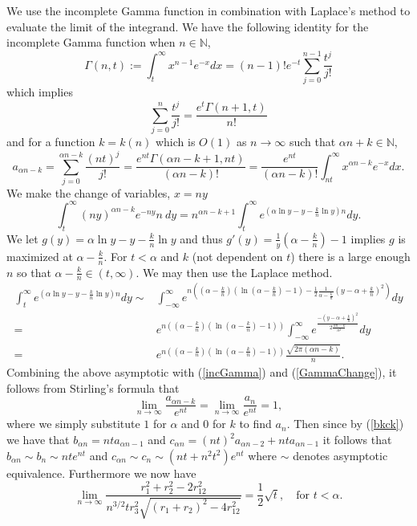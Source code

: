 \documentclass[12pt]{amsart}
\theoremstyle{remark}
\begin{document}
We use the incomplete Gamma function in combination with Laplace's method to evaluate the limit of the integrand.  We have the following identity for the incomplete Gamma function when $n\in\mathbb{N}$,
\[\Gamma(n,t):=\int_t^\infty x^{n-1}e^{-x}dx=(n-1)!e^{-t}\sum_{j=0}^{n-1}\frac{t^j}{j!}\]
which implies
\[\sum_{j=0}^n\frac{t^j}{j!}=\frac{e^t\Gamma(n+1,t)}{n!}\]
and for a function $k=k(n)$ which is $O(1)$ as $n\rightarrow \infty$ such that $\alpha n +k\in\mathbb{N}$,
\begin{equation}
	\label{incGamma}
	a_{\alpha n-k}=\sum_{j=0}^{\alpha n-k}\frac{(nt)^j}{j!}
	=\frac{e^{nt}\Gamma(\alpha n-k+1,nt)}{(\alpha n-k)!}
	=\frac{e^{nt}}{(\alpha n-k)!}\int_{nt}^\infty x^{\alpha n-k}e^{-x}dx.
\end{equation}
We make the change of variables, $x=ny$
\begin{equation}
	\label{GammaChange}
	\int_t^\infty(ny)^{\alpha n-k}e^{-ny}n\ dy
	=n^{\alpha n-k+1}\int_t^\infty e^{(\alpha \ln y-y-\frac{k}{n}\ln y)n}dy.
\end{equation}
We let $g(y)=\alpha \ln y-y-\frac{k}{n}\ln y$ and thus $g'(y)=\frac{1}{y}\left(\alpha-\frac{k}{n}\right)-1$ implies $g$ is maximized at $\alpha-\frac{k}{n}$.  For $t<\alpha$ and $k$ (not dependent on $t$) there is a large enough $n$ so that $\alpha-\frac{k}{n}\in(t,\infty)$.  We may then use the Laplace method.
\begin{align*}
	\int_t^\infty e^{(\alpha\ln y-y-\frac{k}{n}\ln y)n}dy\sim
		&\int_{-\infty}^\infty e^{n\left(\left(\alpha-\frac{k}{n}\right)
		\left(\ln\left(\alpha-\frac{k}{n}\right)-1\right)
		-\frac{1}{2}\frac{1}{\alpha-\frac{k}{n}}
		\left(y-\alpha+\frac{k}{n}\right)^2\right)}dy
	\\=&e^{n\left(\left(\alpha-\frac{k}{n}\right)
		\left(\ln\left(\alpha-\frac{k}{n}\right)-1\right)\right)}
		\int_{-\infty}^\infty e^{\frac{-\left(y-\alpha+\frac{k}{n}\right)^2}
		{2\frac{\alpha n-k}{n^2}}}dy
	\\=&e^{n\left(\left(\alpha-\frac{k}{n}\right)
		\left(\ln\left(\alpha-\frac{k}{n}\right)-1\right)\right)}
		\frac{\sqrt{2\pi(\alpha n-k)}}{n}.
\end{align*}
Combining the above asymptotic with (\ref{incGamma}) and (\ref{GammaChange}), it follows from Stirling's formula that
\[\lim_{n\rightarrow\infty}\frac{a_{\alpha n-k}}{e^{nt}}=\lim_{n\rightarrow\infty}\frac{a_{n}}{e^{nt}}=1,\]
where we simply substitute $1$ for $\alpha$ and $0$ for $k$ to find $a_n$.  Then since by (\ref{bkck}) we have that $b_{\alpha n} = nt a_{\alpha n - 1}$ and $c_{\alpha n} = (nt)^2a_{\alpha n - 2} + nt a_{\alpha n - 1}$ it follows that $b_{\alpha n}\sim b_n\sim nte^{nt}$ and $c_{\alpha n}\sim c_n\sim(nt+n^2t^2)e^{nt}$ where $\sim$ denotes asymptotic equivalence. Furthermore we now have
\[\lim_{n\rightarrow\infty}\frac{r_1^2+r_2^2-2r_{12}^2}{n^{3/2}t r_3^2\sqrt{(r_1+r_2)^2-4r_{12}^2}}=\frac{1}{2}\sqrt{t},\quad\text{for $t<\alpha$}.\]
\end{document}
